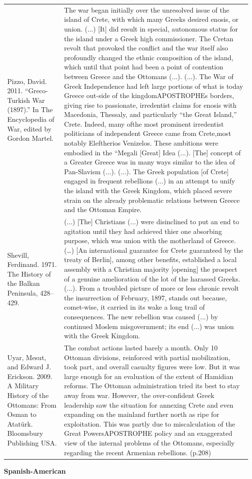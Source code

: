 {\begin{longtable}{p{}p{}}
Pizzo, David. 2011. “Greco-Turkish War (1897).” In The Encyclopedia of War, edited by Gordon Martel. & The war began initially over the unresolved issue of the island of Crete, with which many Greeks desired enosis, or union. (...) [It] did result in special, autonomous status for the island under a Greek high commissioner. The Cretan revolt that provoked the conflict and the war itself also profoundly changed the ethnic composition of the island, which until that point had been a point of contention between Greece and the Ottomans (...). (...). The War of Greek Independence had left large portions of what is today Greece out-side of the kingdomAPOSTROPHEs borders, giving rise to passionate, irredentist claims for enosis with Macedonia, Thessaly, and particularly “the Great Island,” Crete. Indeed, many ofthe most prominent irredentist politicians of independent Greece came from Crete,most notably Eleftherios Venizelos. These ambitions were embodied in the “Megali [Great] Idea (...). [The] concept of a Greater Greece was in many ways similar to the idea of Pan-Slavism (...). (...). The Greek population [of Crete] engaged in frequent rebellions (...) in an attempt to unify the island with the Greek Kingdom, which placed severe strain on the already problematic relations between Greece and the Ottoman Empire. 
\\
Shevill, Ferdinand. 1971. The History of the Balkan Peninsula, 428–429. & (...) [The] Christians (...) were disinclined to put an end to agitation until they had achieved thier one absorbing purpose, which was union with the motherland of Greece. (…) [An international guarantee for Crete guaranteed by the treaty of Berlin], among other benefits, established a local assembly with a Christian majority [opening] the prospect of a genuine amelioration of the lot of the harassed Greeks. (...). From a troubled picture of more or less chronic revolt the insurrection of February, 1897, stands out because, comet-wise, it carried in its wake a long trail of consequences. The new rebellion was caused (...) by continued Moslem misgovernment; its end (...) was union with the Greek Kingdom. 
\\
Uyar, Mesut, and Edward J. Erickson. 2009. A Military History of the Ottomans: From Osman to Atatürk. Bloomsbury Publishing USA. & The combat actions lasted barely a month. Only 10 Ottoman divisions, reinforced with partial mobilization, took part, and overall casualty figures were low. But it was large enough for an evaluation of the extent of Hamidian reforms. 
The Ottoman administration tried its best to stay away from war. However, the
over-confident Greek leadership saw the situation for annexing Crete and even expanding on the mainland further north as ripe for exploitation. This was partly due to miscalculation of the Great PowersAPOSTROPHE policy and an exaggerated view of the internal problems of the Ottomans, especially regarding the recent Armenian rebellions. (p.208)
\\
\end{longtable}}
\clearpage
         \textbf{Spanish-American} 

